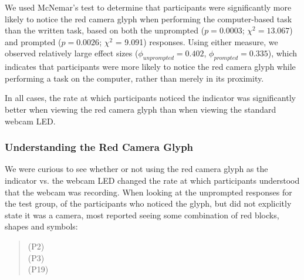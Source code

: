 \documentclass{sigchi}
\begin{document}
We used McNemar's test to determine that participants were significantly more likely to notice the red camera glyph when performing the computer-based task than the written task, based on both the unprompted ($p=0.0003$; $\chi^2 = 13.067$) and prompted ($p=0.0026$; $\chi^2$ = 9.091) responses.  Using either measure, we observed relatively large effect sizes ($\phi_{unprompted} = 0.402$, $\phi_{prompted} = 0.335$), which indicates that participants were more likely to notice the red camera glyph while performing a task on the computer, rather than merely in its proximity.


In all cases, the rate at which participants noticed the indicator was significantly better when viewing the red camera glyph than when viewing the standard webcam LED.

\subsubsection{Understanding the Red Camera Glyph}

We were curious to see whether or not using the red camera glyph as the indicator vs. the webcam LED changed the rate at which participants understood that the webcam was recording. When looking at the unprompted responses for the test group, of the participants who noticed the glyph, but did not explicitly state it was a camera, most reported seeing some combination of red blocks, shapes and symbols:

\begin{quotation}
 (P2)\\

 (P3)\\


 (P19)


\end{quotation}
\end{document}
